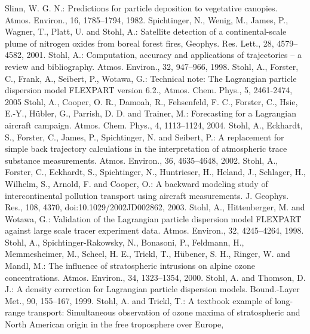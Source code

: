 \documentclass{egu}                  %
\begin{document}
\begin{thebibliography}{}
Slinn, W. G. N.:
Predictions for particle deposition to vegetative canopies.
Atmos. Environ., 16, 1785--1794, 1982.
Spichtinger, N., Wenig, M., James, P., Wagner, T., Platt, U. and Stohl, A.:
Satellite detection of a continental-scale plume of nitrogen oxides from boreal forest fires,
Geophys. Res. Lett., 28, 4579--4582, 2001.
Stohl, A.:
Computation, accuracy and applications of trajectories -- a review and bibliography.
Atmos. Environ., 32, 947--966, 1998.
Stohl, A., Forster, C., Frank, A., Seibert, P., Wotawa, G.: 
Technical note: The Lagrangian particle dispersion model FLEXPART version 6.2., 
Atmos. Chem. Phys., 5, 2461-2474, 2005
Stohl, A., Cooper, O. R., Damoah, R., Fehsenfeld, F. C., Forster, C., Hsie, E.-Y., Hübler, G., Parrish,
D. D. and Trainer, M.:
Forecasting for a Lagrangian aircraft campaign.
Atmos. Chem. Phys., 4, 1113--1124, 2004.
Stohl, A., Eckhardt, S., Forster, C., James, P., Spichtinger, N. and Seibert, P.:
A replacement for simple back trajectory calculations in the interpretation of atmospheric trace substance measurements.
Atmos. Environ., 36, 4635--4648, 2002.
Stohl, A., Forster, C., Eckhardt, S., Spichtinger, N., Huntrieser, H., Heland, J., Schlager, H., Wilhelm, S., Arnold, F. and Cooper, O.:
A backward modeling study of intercontinental pollution transport using aircraft measurements.
J. Geophys. Res., 108, 4370, doi:10.1029/2002JD002862, 2003.
Stohl, A., Hittenberger, M. and Wotawa, G.:
Validation of the Lagrangian particle dispersion model FLEXPART against large scale tracer experiment data.
Atmos. Environ., 32, 4245--4264, 1998.
Stohl, A., Spichtinger-Rakowsky, N., Bonasoni, P., Feldmann, H., Memmesheimer, M., Scheel, H. E., Trickl, T., H\"ubener, S. H., Ringer, W. and Mandl, M.:
The influence of stratospheric intrusions on alpine ozone concentrations.
Atmos. Environ., 34, 1323--1354, 2000. 
Stohl, A. and Thomson, D. J.:
A density correction for Lagrangian particle dispersion models.
Bound.-Layer Met., 90, 155--167, 1999.
Stohl, A. and Trickl, T.:
A textbook example of long-range transport: Simultaneous observation of ozone maxima of stratospheric and North American origin in the free troposphere over Europe,

\end{thebibliography}
\end{document}

